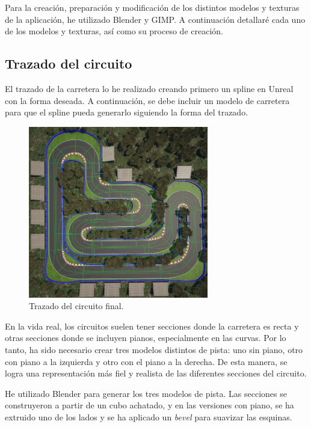 Para la creación, preparación y modificación de los distintos modelos y texturas de la aplicación, he utilizado Blender\cite{blender} y GIMP\cite{gimp}. A continuación detallaré cada uno de los modelos y texturas, así como su proceso de creación.

\subsection{Trazado del circuito}

El trazado de la carretera lo he realizado creando primero un spline en Unreal con la forma deseada. A continuación, se debe incluir un modelo de carretera para que el spline pueda generarlo siguiendo la forma del trazado.
\begin{figure}[H]
    \centering
    \includegraphics[width=0.7\textwidth]{imagenes/converted/trazadoFinal.jpg}
    \caption{Trazado del circuito final.}
    \label{fig:trazado}
\end{figure}


En la vida real, los circuitos suelen tener secciones donde la carretera es recta y otras secciones donde se incluyen pianos, especialmente en las curvas. Por lo tanto, ha sido necesario crear tres modelos distintos de pista: uno sin piano, otro con piano a la izquierda y otro con el piano a la derecha. De esta manera, se logra una representación más fiel y realista de las diferentes secciones del circuito.

\bigskip

He utilizado Blender para generar los tres modelos de pista. Las secciones se construyeron a partir de un cubo achatado, y en las versiones con piano, se ha extruido uno de los lados y se ha aplicado un \textit{bevel} para suavizar las esquinas.

